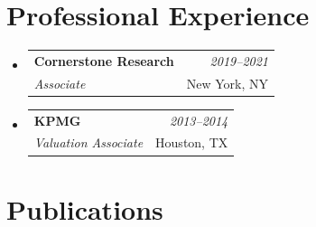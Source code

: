 \documentclass[letterpaper,11pt]{article}
\makeatletter
\newcommand{\sectionspacing}{\vspace{-2mm}}
\newcommand{\resumeSubheading}[4]{
\vspace{0.5mm}\item
    \begin{tabular*}{0.98\textwidth}[t]{l@{\extracolsep{\fill}}r}
        \textbf{#1} & \textit{\footnotesize{#4}} \\
        \textit{\footnotesize{#3}} &  \footnotesize{#2}\\
    \end{tabular*}
    \vspace{-2.4mm}
}
\newcommand{\resumeSubHeadingListStart}{\begin{itemize}[leftmargin=*,labelsep=1mm]}
\newcommand{\resumeSubHeadingListEnd}{\end{itemize}\vspace{2mm}}
\makeatother
\begin{document}
\section{\textbf{Professional Experience}}
\vspace{-0.4mm}
\resumeSubHeadingListStart
\resumeSubheading
    {Cornerstone Research}{New York, NY}
    {Associate}{2019--2021}
\resumeSubheading
    {KPMG}{Houston, TX}
    {Valuation Associate}{2013--2014}
\resumeSubHeadingListEnd
\sectionspacing
\section{\textbf{Publications}}
\vspace{0.2mm}
\end{document}
